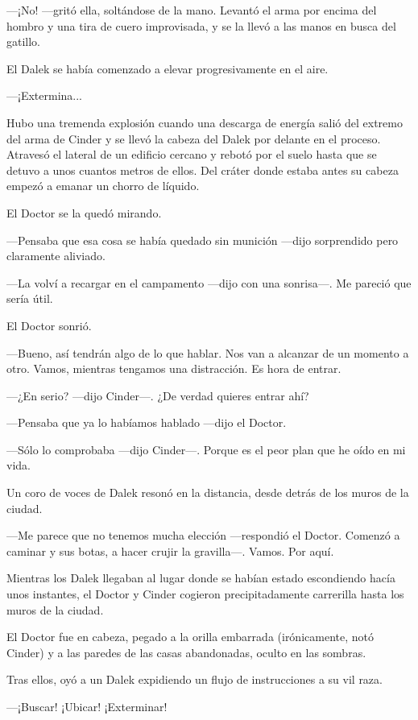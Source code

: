 —¡No! —gritó ella, soltándose de la mano. Levantó el arma por encima del hombro y una tira de cuero improvisada, y se la llevó a las manos en busca del gatillo.

El Dalek se había comenzado a elevar progresivamente en el aire.

—¡Extermina...

Hubo una tremenda explosión cuando una descarga de energía salió del extremo del arma de Cinder y se llevó la cabeza del Dalek por delante en el proceso. Atravesó el lateral de un edificio cercano y rebotó por el suelo hasta que se detuvo a unos cuantos metros de ellos. Del cráter donde estaba antes su cabeza empezó a emanar un chorro de líquido.

El Doctor se la quedó mirando.

—Pensaba que esa cosa se había quedado sin munición —dijo sorprendido pero claramente aliviado.

—La volví a recargar en el campamento —dijo con una sonrisa—. Me pareció que sería útil.

El Doctor sonrió.

—Bueno, así tendrán algo de lo que hablar. Nos van a alcanzar de un momento a otro. Vamos, mientras tengamos una distracción. Es hora de entrar.

—¿En serio? —dijo Cinder—. ¿De verdad quieres entrar ahí?

—Pensaba que ya lo habíamos hablado —dijo el Doctor.

—Sólo lo comprobaba —dijo Cinder—. Porque es el peor plan que he oído en mi vida.

Un coro de voces de Dalek resonó en la distancia, desde detrás de los muros de la ciudad.

—Me parece que no tenemos mucha elección —respondió el Doctor. Comenzó a caminar y sus botas, a hacer crujir la gravilla—. Vamos. Por aquí.



Mientras los Dalek llegaban al lugar donde se habían estado escondiendo hacía unos instantes, el Doctor y Cinder cogieron precipitadamente carrerilla hasta los muros de la ciudad.

El Doctor fue en cabeza, pegado a la orilla embarrada (irónicamente, notó Cinder) y a las paredes de las casas abandonadas, oculto en las sombras.

Tras ellos, oyó a un Dalek expidiendo un flujo de instrucciones a su vil raza.



—¡Buscar! ¡Ubicar! ¡Exterminar!



